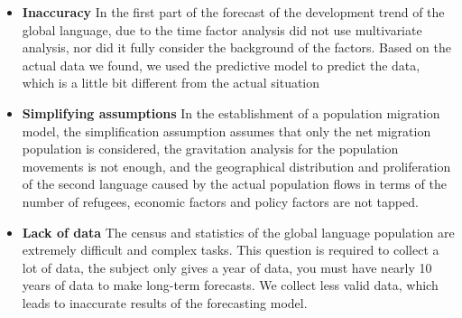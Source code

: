 \begin{itemize}
	\item \textbf{Inaccuracy} \newline
	In the first part of the forecast of the development trend of the global language, due to the time factor analysis did not use multivariate analysis, nor did it fully consider the background of the factors. Based on the actual data we found, we used the predictive model to predict the data, which is a little bit different from the actual situation
	\item \textbf{Simplifying assumptions}
	\newline In the establishment of a population migration model, the simplification assumption assumes that only the net migration population is considered, the gravitation analysis for the population movements is not enough, and the geographical distribution and proliferation of the second language caused by the actual population flows in terms of the number of refugees, economic factors and policy factors are not tapped.
	\item \textbf{Lack of data}
	\newline 
	The census and statistics of the global language population are extremely difficult and complex tasks. This question is required to collect a lot of data, the subject only gives a year of data, you must have nearly 10 years of data to make long-term forecasts. We collect less valid data, which leads to inaccurate results of the forecasting model.
\end{itemize}